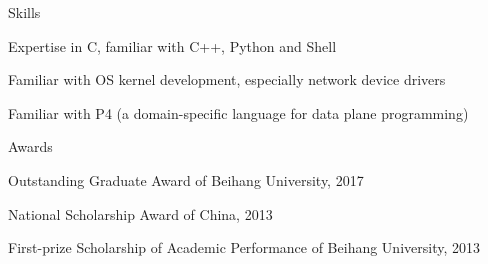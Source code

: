\documentclass{resume} %
\begin{document}
\begin{rSection}{Skills} \itemsep -3pt

\item Expertise in C, familiar with C++, Python and Shell
\item Familiar with OS kernel development, especially network device drivers
\item Familiar with P4 (a domain-specific language for data plane programming)

\end{rSection}


\begin{rSection}{Awards} \itemsep -3pt
\item Outstanding Graduate Award of Beihang University, 2017
\item National Scholarship Award of China, 2013
\item First-prize Scholarship of Academic Performance of Beihang University, 2013

\end{rSection}
\end{document}
